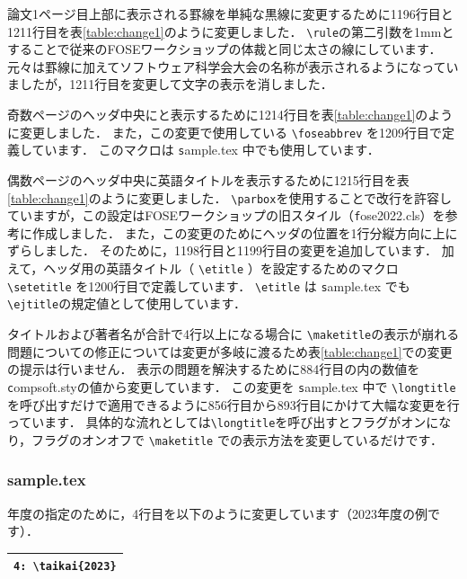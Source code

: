\documentclass[T,J]{fose} %
\begin{document}
論文1ページ目上部に表示される罫線を単純な黒線に変更するために1196行目と1211行目を表\ref{table:change1}のように変更しました．
\verb|\rule|の第二引数を1mmとすることで従来のFOSEワークショップの体裁と同じ太さの線にしています．
元々は罫線に加えてソフトウェア科学会大会の名称が表示されるようになっていましたが，1211行目を変更して文字の表示を消しました．

奇数ページのヘッダ中央に{\textbf \foseabbrev}と表示するために1214行目を表\ref{table:change1}のように変更しました．
また，この変更で使用している \verb|\foseabbrev| を1209行目で定義しています．
このマクロは {\texttt sample.tex} 中でも使用しています．

偶数ページのヘッダ中央に英語タイトルを表示するために1215行目を表\ref{table:change1}のように変更しました．
\verb|\parbox|を使用することで改行を許容していますが，この設定はFOSEワークショップの旧スタイル（{\texttt fose2022.cls}）を参考に作成しました．
また，この変更のためにヘッダの位置を1行分縦方向に上にずらしました．
そのために，1198行目と1199行目の変更を追加しています．
加えて，ヘッダ用の英語タイトル（ \verb|\etitle| ）を設定するためのマクロ \verb|\setetitle| を1200行目で定義しています．
\verb|\etitle| は {\texttt sample.tex} でも \verb|\ejtitle|の規定値として使用しています．

タイトルおよび著者名が合計で4行以上になる場合に \verb|\maketitle|の表示が崩れる問題についての修正については変更が多岐に渡るため表\ref{table:change1}での変更の提示は行いません．
表示の問題を解決するために884行目の内の数値を {\texttt compsoft.sty}の値から変更しています．
この変更を {\texttt sample.tex} 中で \verb|\longtitle| を呼び出すだけで適用できるように856行目から893行目にかけて大幅な変更を行っています．
具体的な流れとしては\verb|\longtitle|を呼び出すとフラグがオンになり，フラグのオンオフで \verb|\maketitle| での表示方法を変更しているだけです．

\subsubsection*{sample.tex}
年度の指定のために，4行目を以下のように変更しています（2023年度の例です）．

\begin{tabularx}{23zw}{|X|}
	\hline
	\verb|4: \taikai{2023}|
	\\
	\hline
\end{tabularx}
\end{document}
